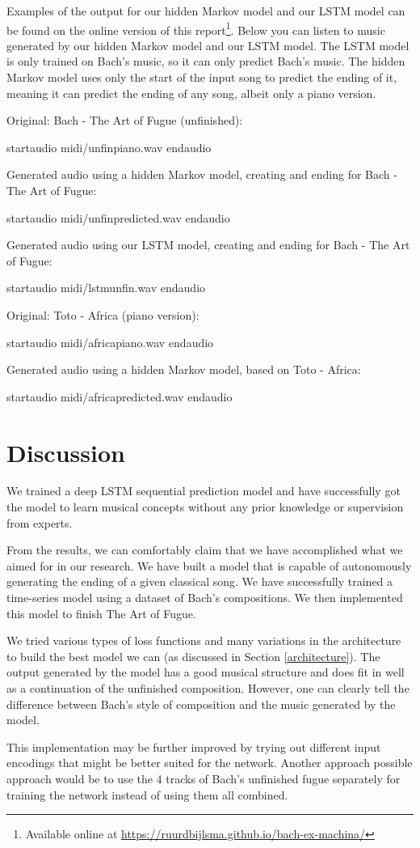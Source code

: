 \documentclass[11pt, twocolumn]{article}
\begin{document}
\ifpdf
Examples of the output for our hidden Markov model and our LSTM model can be found on the online version of this report\footnote{Available online at \url{https://ruurdbijlsma.github.io/bach-ex-machina/}}.
\else
Below you can listen to music generated by our hidden Markov model and our LSTM model. The LSTM model is only trained on Bach's music, so it can only predict Bach's music. The hidden Markov model uses only the start of the input song to predict the ending of it, meaning it can predict the ending of any song, albeit only a piano version.

Original: Bach - The Art of Fugue (unfinished):

startaudio midi/unfinpiano.wav endaudio

Generated audio using a hidden Markov model, creating and ending for Bach - The Art of Fugue:

startaudio midi/unfinpredicted.wav endaudio

Generated audio using our LSTM model, creating and ending for Bach - The Art of Fugue:

startaudio midi/lstmunfin.wav endaudio

Original: Toto - Africa (piano version):

startaudio midi/africapiano.wav endaudio

Generated audio using a hidden Markov model, based on Toto - Africa:

startaudio midi/africapredicted.wav endaudio

\fi

\section{Discussion}
 We trained a deep LSTM sequential prediction model and have successfully got the model to learn musical concepts without any prior knowledge or supervision from experts.

From the results, we can comfortably claim that we have accomplished what we aimed for in our research. We have built a model that is capable of autonomously generating the ending of a given classical song. We have successfully trained a time-series model using a dataset of Bach's compositions. We then implemented this model to finish The Art of Fugue.

We tried various types of loss functions and many variations in the architecture to build the best model we can (as discussed in Section \ref{architecture}). The output generated by the model has a good musical structure and does fit in well as a continuation of the unfinished composition. However, one can clearly tell the difference between Bach's style of composition and the music generated by the model.

This implementation may be further improved by trying out different input encodings that might be better suited for the network. Another approach possible approach would be to use the 4 tracks of Bach's unfinished fugue separately for training the network instead of using them all combined.



\end{document}
